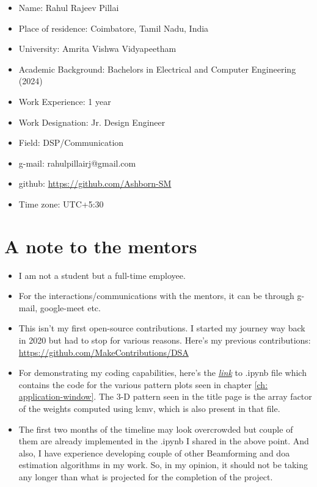\begin{itemize}
	\item Name: Rahul Rajeev Pillai
	\item Place of residence: Coimbatore, Tamil Nadu, India
	\item University: Amrita Vishwa Vidyapeetham
	\item Academic Background: Bachelors in Electrical and Computer Engineering (2024)
	\item Work Experience: 1 year
	\item Work Designation: Jr. Design Engineer
	\item Field: DSP/Communication
	\item g-mail: rahulpillairj@gmail.com
	\item github: \href{https://github.com/Ashborn-SM}{https://github.com/Ashborn-SM}
	\item Time zone: UTC+5:30
	
\end{itemize}

\section{A note to the mentors}
\begin{itemize}
	\item I am not a student but a full-time employee.
	\item For the interactions/communications with the mentors, it can be through g-mail, google-meet etc.
	\item This isn't my first open-source contributions. I started my journey way back in 2020 but had to stop for various reasons. Here's my previous contributions:  \href{https://github.com/MakeContributions/DSA/pulls?q=is%3Apr+is%3Aclosed+assignee%3AAshborn-SM+}{https://github.com/MakeContributions/DSA}
	\item For demonstrating my coding capabilities, here's the \href{https://github.com/Ashborn-SM/GSoC-Proposal/blob/main/plots.ipynb}{\textit{link}} to .ipynb file which contains the code for the various pattern plots seen in chapter \ref{ch: application-window}. The 3-D pattern seen in the title page is the array factor of the weights computed using \ac{lcmv}, which is also present in that file.
	\item The first two months of the timeline may look overcrowded but couple of them are already implemented in the .ipynb I shared in the above point. And also, I have experience developing couple of other Beamforming and \ac{doa} estimation algorithms in my work. So, in my opinion, it should not be taking any longer than what is projected for the completion of the project.
\end{itemize}


